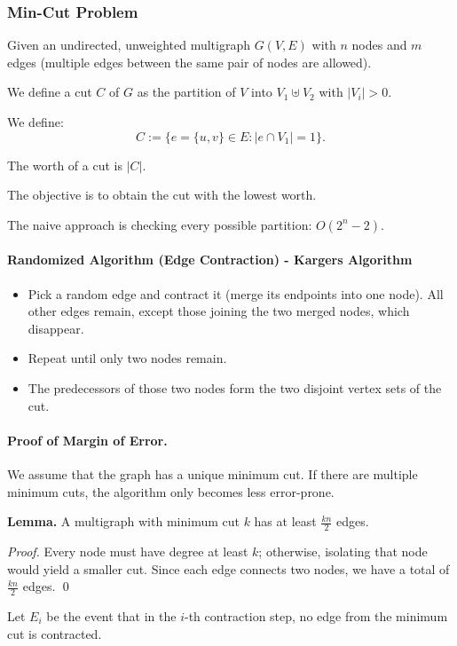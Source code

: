 \documentclass{article}
\begin{document}
\subsubsection{Min-Cut Problem}
Given an undirected, unweighted multigraph $G(V,E)$ with $n$ nodes and $m$ edges  
(multiple edges between the same pair of nodes are allowed).

We define a cut $C$ of $G$ as the partition of $V$ into $V_1 \uplus V_2$ with $|V_i| > 0$.

We define:
\[
C := \{ e = \{u,v\} \in E : |e \cap V_1| = 1 \}.
\]

The worth of a cut is $|C|$.

The objective is to obtain the cut with the lowest worth.

The naive approach is checking every possible partition: $O(2^n - 2)$.

\paragraph{Randomized Algorithm (Edge Contraction) - Kargers Algorithm}
\begin{itemize}
    \item Pick a random edge and contract it (merge its endpoints into one node).  
    All other edges remain, except those joining the two merged nodes, which disappear.
    \item Repeat until only two nodes remain.
    \item The predecessors of those two nodes form the two disjoint vertex sets of the cut.
\end{itemize}

\paragraph{Proof of Margin of Error.}
We assume that the graph has a unique minimum cut.  
If there are multiple minimum cuts, the algorithm only becomes less error-prone.

\textbf{Lemma.}  
A multigraph with minimum cut $k$ has at least $\tfrac{kn}{2}$ edges.

\textit{Proof.}  
Every node must have degree at least $k$; otherwise, isolating that node would yield a smaller cut.  
Since each edge connects two nodes, we have a total of $\tfrac{kn}{2}$ edges. \qed

Let $E_i$ be the event that in the $i$-th contraction step, no edge from the minimum cut is contracted.
\end{document}

